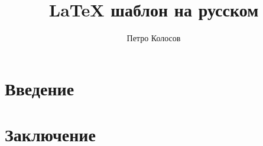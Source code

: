 \documentclass[12pt,a4paper]{article}
\title{LaTeX шаблон на русском}
\date{} %
\author{Петро Колосов}
\numberwithin{equation}{section}
\begin{document}
    \maketitle

    \begin{abstract}
        
    \end{abstract}


    \section{Введение} \label{sec:introduction}
    


    \section{Заключение}\label{sec:conclusions}
    

    
    
\end{document}
